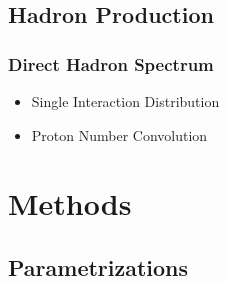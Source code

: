 	\subsection{Hadron Production}

	\begin{frame}
		\frametitle{Direct Hadron Spectrum}
		\begin{itemize}
			\item<1-> Single Interaction Distribution
		\end{itemize}
		\begin{itemize}
			\item<3-> Proton Number Convolution
		\end{itemize}
	\end{frame}



	\section{Methods}

	\begin{frame}
		
	\end{frame}

	\begin{frame}
		\addtocounter{framenumber}{-1}
		
	\end{frame}

	\begin{frame}
		\addtocounter{framenumber}{-1}
		
	\end{frame}

	\subsection{Parametrizations}

